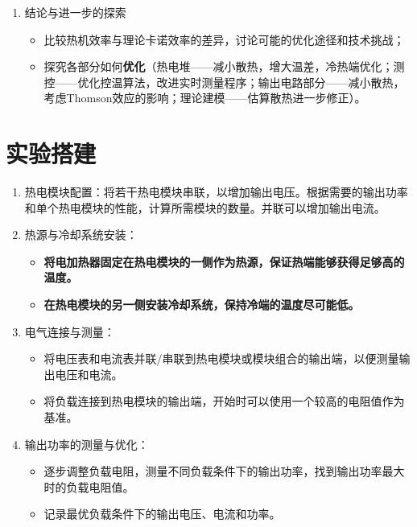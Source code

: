 \documentclass[dvipsnames, svgnames,a4paper,11pt]{article}
\begin{document}
\begin{enumerate}
            \item 结论与进一步的探索
            \begin{itemize}
                \item 比较热机效率与理论卡诺效率的差异，讨论可能的优化途径和技术挑战；
                \item 探究各部分如何\textbf{优化}（热电堆——减小散热，增大温差，冷热端优化；测控——优化控温算法，改进实时测量程序；输出电路部分——减小散热，考虑Thomson效应的影响；理论建模——估算散热进一步修正）。
            \end{itemize}
        \end{enumerate}









\section{实验搭建}


    \begin{enumerate}
        \item 热电模块配置：将若干热电模块串联，以增加输出电压。根据需要的输出功率和单个热电模块的性能，计算所需模块的数量。并联可以增加输出电流。
        
        \item 热源与冷却系统安装：
        \begin{itemize}
            \item \textbf{将电加热器固定在热电模块的一侧作为热源，保证热端能够获得足够高的温度。}
            \item \textbf{在热电模块的另一侧安装冷却系统，保持冷端的温度尽可能低。}
        \end{itemize}				
        
        \item 电气连接与测量：
        \begin{itemize}
            \item 将电压表和电流表并联/串联到热电模块或模块组合的输出端，以便测量输出电压和电流。
            \item 将负载连接到热电模块的输出端，开始时可以使用一个较高的电阻值作为基准。
        \end{itemize}
        
        \item 输出功率的测量与优化：
        \begin{itemize}
            \item 逐步调整负载电阻，测量不同负载条件下的输出功率，找到输出功率最大时的负载电阻值。
            \item 记录最优负载条件下的输出电压、电流和功率。
        \end{itemize}			
        
    \end{enumerate}
\end{document}
